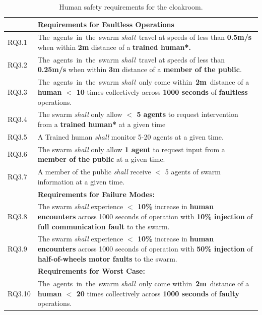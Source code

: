 \documentclass[lettersize,journal]{IEEEtran}
\begin{document}
\begin{table}[!h]
	\centering
	\begin{tabular}{|p{9mm}|p{72mm}|}
		\hline
		& \textbf{Requirements for Faultless Operations} \\
		\hline
		RQ3.1 & The agents in the swarm \emph{shall} travel at speeds of less than \textbf{0.5m/s} when within \textbf{2m} distance of a \textbf{trained human*.}
		\\ 
		\hline
		RQ3.2 & The agents in the swarm \emph{shall} travel at speeds of less than \textbf{0.25m/s} when within \textbf{3m} distance of a \textbf{member of the public}.
		\\ 
		\hline
		RQ3.3 & The agents in the swarm \emph{shall} only come within \textbf{2m} distance of a \textbf{human $<$ 10} times collectively across \textbf{1000 seconds} of \textbf{faultless} operations.
		\\ 
		\hline
		RQ3.4 & The swarm \emph{shall} only allow \textbf{$<$ 5 agents} to request intervention from a \textbf{trained human*} at a given time
		\\ 
		\hline
		RQ3.5 & A Trained human \emph{shall} monitor 5-20 agents at a given time.
		\\ 
		\hline
		RQ3.6 & The swarm \emph{shall} only allow \textbf{1 agent} to request input from a \textbf{member of the public} at a given time.
		\\ 
		\hline
		RQ3.7 & A member of the public \emph{shall} receive $<$ 5 agents of swarm information at a given time.
		\\ 
		\hline
		& \textbf{Requirements for Failure Modes: } \\
		\hline
		RQ3.8 & The swarm \emph{shall} experience \textbf{$<$ 10\%} increase in \textbf{human encounters} across 1000 seconds of operation with \textbf{10\% injection} of \textbf{full communication fault} to the swarm. \\
		\hline
		RQ3.9 & The swarm \emph{shall} experience \textbf{$<$ 10\%} increase in \textbf{human encounters }across 1000 seconds of operation with \textbf{50\% injection} of \textbf{half-of-wheels motor faults} to the swarm.\\ 
		\hline
		& \textbf{Requirements for Worst Case: } \\
		\hline
		RQ3.10 & The agents in the swarm \emph{shall} only come within \textbf{2m} distance of a \textbf{human $<$ 20} times collectively across \textbf{1000 seconds} of \textbf{faulty} operations.
		\\		[1ex] 		
		\hline
	\end{tabular}
	\caption{\label{tab:human-s}Human safety requirements for the cloakroom.}
\end{table}   
\end{document}
